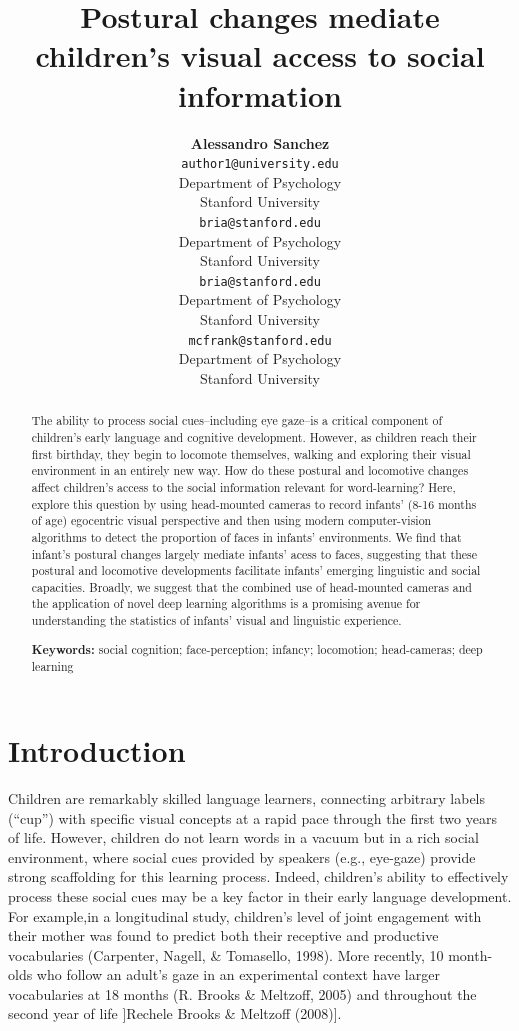 \documentclass[10pt, letterpaper]{article}
\title{Postural changes mediate children's visual access to social information}
\author{{\large \bf Alessandro Sanchez} \\ \texttt{author1@university.edu} \\ Department of Psychology \\ Stanford University \And {\large \bf Bria Long} \\ \texttt{bria@stanford.edu} \\ Department of Psychology \\ Stanford University
    \And {\large \bf Ally Kraus} \\ \texttt{bria@stanford.edu} \\ Department of Psychology \\ Stanford University
    \And {\large \bf Michael C. Frank} \\ \texttt{mcfrank@stanford.edu} \\ Department of Psychology \\ Stanford University}
\begin{document}
\maketitle

\begin{abstract}
The ability to process social cues--including eye gaze--is a critical
component of children's early language and cognitive development.
However, as children reach their first birthday, they begin to locomote
themselves, walking and exploring their visual environment in an
entirely new way. How do these postural and locomotive changes affect
children's access to the social information relevant for word-learning?
Here, explore this question by using head-mounted cameras to record
infants' (8-16 months of age) egocentric visual perspective and then
using modern computer-vision algorithms to detect the proportion of
faces in infants' environments. We find that infant's postural changes
largely mediate infants' acess to faces, suggesting that these postural
and locomotive developments facilitate infants' emerging linguistic and
social capacities. Broadly, we suggest that the combined use of
head-mounted cameras and the application of novel deep learning
algorithms is a promising avenue for understanding the statistics of
infants' visual and linguistic experience.

\textbf{Keywords:}
social cognition; face-perception; infancy; locomotion; head-cameras;
deep learning
\end{abstract}

\section{Introduction}\label{introduction}

Children are remarkably skilled language learners, connecting arbitrary
labels (``cup'') with specific visual concepts at a rapid pace through
the first two years of life. However, children do not learn words in a
vacuum but in a rich social environment, where social cues provided by
speakers (e.g., eye-gaze) provide strong scaffolding for this learning
process. Indeed, children's ability to effectively process these social
cues may be a key factor in their early language development. For
example,in a longitudinal study, children's level of joint engagement
with their mother was found to predict both their receptive and
productive vocabularies (Carpenter, Nagell, \& Tomasello, 1998). More
recently, 10 month-olds who follow an adult's gaze in an experimental
context have larger vocabularies at 18 months (R. Brooks \& Meltzoff,
2005) and throughout the second year of life {]}Rechele Brooks \&
Meltzoff (2008){]}.
\end{document}
